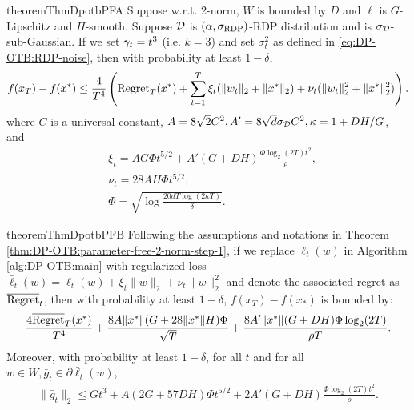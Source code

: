 \begin{restatable}{theorem}{ThmDpotbPFA}
\label{thm:DP-OTB:parameter-free-2-norm-step-1}
Suppose w.r.t. 2-norm, $W$ is bounded by $D$ and $\ell$ is $G$-Lipschitz and $H$-smooth. Suppose ${\cal D}$ is $(\alpha,\sigma_{\mathrm{RDP}})$-RDP distribution and is $\sigma_{\cal D}$-sub-Gaussian. If we set $\gamma_t=t^3$ (i.e. $k=3$) and set $\sigma_t^2$ as defined in \eqref{eq:DP-OTB:RDP-noise}, then with probability at least $1-\delta$,
\begin{align*}
    f(x_T)-f(x^*) \leq \frac{4}{T^4}\left( \mathrm{Regret}_T(x^*) + \sum_{t=1}^T \xi_t(\|w_t\|_2+\|x^*\|_2) + \nu_t(\|w_t\|_2^2+\|x^*\|_2^2) \right).
\end{align*}
where $C$ is a universal constant, $A=8\sqrt{2}C^2, A'=8\sqrt{d}\sigma_{\cal D} C^2, \kappa=1+DH/G$, 
and
\begin{align*}
    &\xi_t = AG\Phi t^{5/2} + A'(G+DH)\frac{\Phi\log_2(2T)t^2}{\rho} , \\
    &\nu_t = 28AH\Phi t^{5/2}, \\
    &\Phi = \sqrt{\log\frac{20dT\log(2\kappa T)}{\delta}}.
\end{align*}
\end{restatable}

\begin{restatable}{theorem}{ThmDpotbPFB}
\label{thm:DP-OTB:parameter-free-main}
Following the assumptions and notations in Theorem \ref{thm:DP-OTB:parameter-free-2-norm-step-1}, if we replace $\ell_t(w)$ in Algorithm \ref{alg:DP-OTB:main} with regularized loss $\bar \ell_t(w) = \ell_t(w) + \xi_t\|w\|_2 + \nu_t\|w\|_2^2$ and denote the associated regret as $\overline {\mathrm{Regret}}_t$, then with probability at least $1-\delta$, $f(x_T)-f(x_\ast)$ is bounded by:
\begin{align*}
    \frac{4\overline {\mathrm{Regret}}_T(x^*)}{T^4} + \frac{8A\|x^*\|(G+28\|x^*\|H)\Phi}{\sqrt{T}} + \frac{8A'\|x^*\|(G+DH)\Phi\log_2(2T)}{\rho T}.
\end{align*}
Moreover, with probability at least $1-\delta$, for all $t$ and for all $w\in W, \bar g_t \in \partial \bar \ell_t(w)$,
\begin{align*}
    \|\bar g_t\|_2 \leq Gt^3 + A(2G+57DH)\Phi t^{5/2} + 2A'(G+DH)\frac{\Phi\log_2(2T)t^2}{\rho}.
\end{align*}
\end{restatable}

